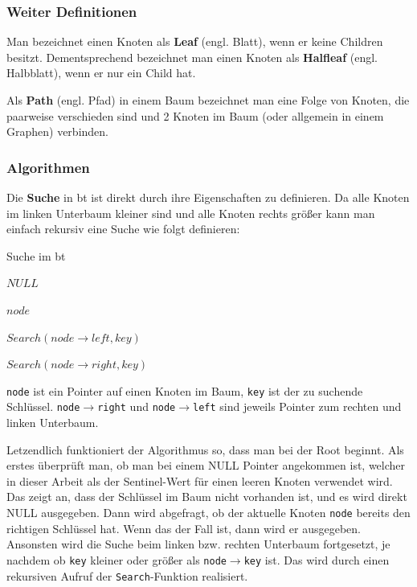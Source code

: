 \documentclass[11pt]{article}
\newcommand{\lstin}[1]{\lstinline[language=C]{#1}}
\begin{document}
\subsubsection{Weiter Definitionen}
Man bezeichnet einen Knoten als \textbf{Leaf} (engl. Blatt), wenn er keine Children besitzt. \cite[S. 36]{aic}
Dementsprechend bezeichnet man einen Knoten als \textbf{Halfleaf} (engl. Halbblatt), wenn er nur ein Child hat. 

Als \textbf{Path} (engl. Pfad) in einem Baum bezeichnet man eine Folge von Knoten, die paarweise verschieden sind und 2 Knoten im Baum (oder allgemein in einem Graphen) verbinden. \cite[S. 36]{aic}

\subsubsection{Algorithmen}

Die \textbf{Suche} in \gls{bt} ist direkt durch ihre Eigenschaften zu definieren. 
Da alle Knoten im linken Unterbaum kleiner sind und alle Knoten rechts größer kann man einfach rekursiv eine Suche wie folgt definieren:

\begin{algorithm}
  \caption{Suche im \gls{bt}}
  \begin{algorithmic}[1]
      
      \Return $NULL$
    \EndIf
      
      \Return $node$
      
      \Return $Search(node \rightarrow left, key)$
    \Else
      
      \Return $Search(node \rightarrow right, key)$
    \EndIf
  \EndProcedure
  \end{algorithmic}
\end{algorithm}

\lstin{node} ist ein Pointer auf einen Knoten im Baum, \lstin{key} ist der zu suchende Schlüssel.
\lstin{node}$\rightarrow$\lstin{right} und \lstin{node}$\rightarrow$\lstin{left} 
sind jeweils Pointer zum rechten und linken Unterbaum.

Letzendlich funktioniert der Algorithmus so, dass man bei der Root beginnt. 
Als erstes überprüft man, ob man bei einem NULL Pointer angekommen ist, welcher in dieser Arbeit als der Sentinel-Wert für einen leeren Knoten verwendet wird. 
Das zeigt an, dass der Schlüssel im Baum nicht vorhanden ist, und es wird direkt NULL ausgegeben.
Dann wird abgefragt, ob der aktuelle Knoten \lstin{node} bereits den richtigen Schlüssel hat. Wenn das der Fall ist, dann wird er ausgegeben.
Ansonsten wird die Suche beim linken bzw. rechten Unterbaum fortgesetzt, je nachdem ob \lstin{key} kleiner oder größer als \lstin{node}$\rightarrow$\lstin{key} ist.
Das wird durch einen rekursiven Aufruf der \lstin{Search}-Funktion realisiert. 
\cite[S. 203]{aic}
\end{document}
